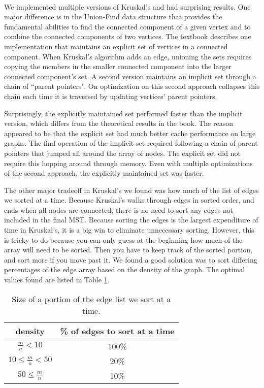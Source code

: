 \paragraph{}
We implemented multiple versions of Kruskal's and had surprising
results. One major difference is in the Union-Find data structure that
provides the fundamental abilities to find the connected component of a
given vertex and to combine the connected components of two vertices. The
textbook describes one implementation that maintains an explicit set of
vertices in a connected component. When Kruskal's algorithm adds an edge,
unioning the sets requires copying the members in the smaller connected
component into the larger connected component's set. A second version
maintains an implicit set through a chain of ``parent
pointers''. On optimization on this second approach collapses this chain
each time it is traversed by updating vertices' parent pointers.

Surprisingly, the explicitly maintained set performed faster than the
implicit version, which differs from the theoretical results in the
book. The reason appeared to
be that the explicit set had much better cache performance on large
graphs. The find operation of the
implicit set required following a chain of parent pointers that jumped
all around the array of nodes. The explicit set did not require this
hopping around through memory. Even with multiple optimizations of the
second approach, the explicitly maintained set was faster.

The other major tradeoff in Kruskal's we found was how much of the list of
edges we sorted at a time. Because Kruskal's walks through edges in sorted
order, and ends when all nodes are connected, there is no need to sort any
edges not included in the final MST. Because sorting the edges is the
largest expenditure of time in Kruskal's, it is a big win to eliminate
unnecessary sorting. However, this is tricky to do because you can only
guess at the beginning how much of the array will need to be sorted. Then
you have to keep track of the sorted portion, and sort more if you move
past it. We found a good solution was to sort differing percentages of the
edge array based on the density of the graph. The optimal values found are
listed in Table \ref{table:kruskal-sort-percent}.

\begin{table}
\begin{tabular}{|c|c|}
\hline
density&\% of edges to sort at a time\\
\hline
$\frac{m}{n} < 10$& 100\% \\
$10 \leq \frac{m}{n} < 50$& 20\% \\
$50 \leq \frac{m}{n}$& 10\% \\
\hline
\end{tabular}
\caption{Size of a portion of the edge list we sort at a time.}
\label{table:kruskal-sort-percent}
\end{table}
